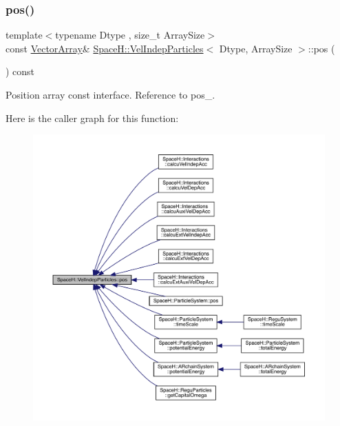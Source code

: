 \subsubsection{\texorpdfstring{pos()}{pos()}\hspace{0.1cm}{\footnotesize\ttfamily [1/2]}}
{\footnotesize\ttfamily template$<$typename Dtype , size\+\_\+t Array\+Size$>$ \\
const \mbox{\hyperlink{class_space_h_1_1_vel_indep_particles_aa9983058940249df8b00fa800e8cbad2}{Vector\+Array}}\& \mbox{\hyperlink{class_space_h_1_1_vel_indep_particles}{Space\+H\+::\+Vel\+Indep\+Particles}}$<$ Dtype, Array\+Size $>$\+::pos (\begin{DoxyParamCaption}{ }\end{DoxyParamCaption}) const\hspace{0.3cm}{\ttfamily [inline]}}



Position array const interface. Reference to pos\+\_\+. 

Here is the caller graph for this function\+:
\nopagebreak
\begin{figure}[H]
\begin{center}
\leavevmode
\includegraphics[width=350pt]{class_space_h_1_1_vel_indep_particles_a12ffb071816842a3d31eb11d49ab5b55_icgraph}
\end{center}
\end{figure}
\mbox{\label{class_space_h_1_1_vel_indep_particles_a542211829ba79bb89fd6212693fe06d4}} 
